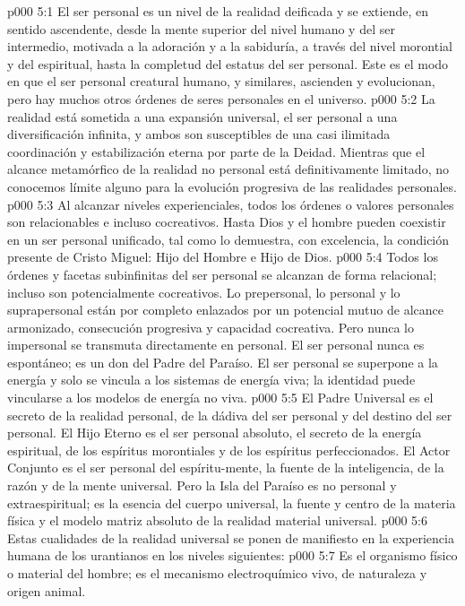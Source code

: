 \vs p000 5:1 El ser personal es un nivel de la realidad deificada y se extiende, en sentido ascendente, desde la mente superior del nivel humano y del ser intermedio, motivada a la adoración y a la sabiduría, a través del nivel morontial y del espiritual, hasta la completud del estatus del ser personal. Este es el modo en que el ser personal creatural humano, y similares, ascienden y evolucionan, pero hay muchos otros órdenes de seres personales en el universo.
\vs p000 5:2 La realidad está sometida a una expansión universal, el ser personal a una diversificación infinita, y ambos son susceptibles de una casi ilimitada coordinación y estabilización eterna por parte de la Deidad. Mientras que el alcance metamórfico de la realidad no personal está definitivamente limitado, no conocemos límite alguno para la evolución progresiva de las realidades personales.
\vs p000 5:3 Al alcanzar niveles experienciales, todos los órdenes o valores personales son relacionables e incluso cocreativos. Hasta Dios y el hombre pueden coexistir en un ser personal unificado, tal como lo demuestra, con excelencia, la condición presente de Cristo Miguel: Hijo del Hombre e Hijo de Dios.
\vs p000 5:4 Todos los órdenes y facetas subinfinitas del ser personal se alcanzan de forma relacional; incluso son potencialmente cocreativos. Lo prepersonal, lo personal y lo suprapersonal están por completo enlazados por un potencial mutuo de alcance armonizado, consecución progresiva y capacidad cocreativa. Pero nunca lo impersonal se transmuta directamente en personal. El ser personal nunca es espontáneo; es un don del Padre del Paraíso. El ser personal se superpone a la energía y solo se vincula a los sistemas de energía viva; la identidad puede vincularse a los modelos de energía no viva.
\vs p000 5:5 \pc El Padre Universal es el secreto de la realidad personal, de la dádiva del ser personal y del destino del ser personal. El Hijo Eterno es el ser personal absoluto, el secreto de la energía espiritual, de los espíritus morontiales y de los espíritus perfeccionados. El Actor Conjunto es el ser personal del espíritu\hyp{}mente, la fuente de la inteligencia, de la razón y de la mente universal. Pero la Isla del Paraíso es no personal y extraespiritual; es la esencia del cuerpo universal, la fuente y centro de la materia física y el modelo matriz absoluto de la realidad material universal.
\vs p000 5:6 \pc Estas cualidades de la realidad universal se ponen de manifiesto en la experiencia humana de los urantianos en los niveles siguientes:
\vs p000 5:7  Es el organismo físico o material del hombre; es el mecanismo electroquímico vivo, de naturaleza y origen animal.
